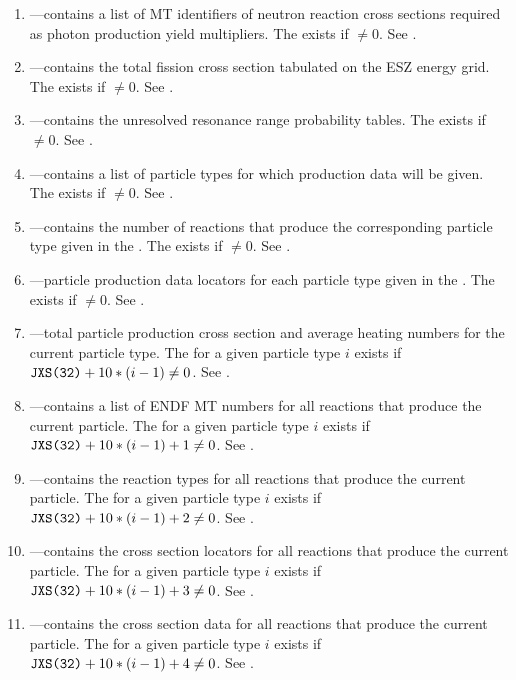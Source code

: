 \begin{enumerate}
  \item \textbf{}---contains a list of MT identifiers of neutron reaction cross sections required as photon production yield multipliers. The  exists if $\neq0$. See .
  \item \textbf{}---contains the total fission cross section tabulated on the ESZ energy grid. The  exists if $\neq0$. See .
  \item \textbf{}---contains the unresolved resonance range probability tables. The  exists if $\neq0$. See .
  \item \textbf{}---contains a list of particle types for which production data will be given. The  exists if $\neq0$. See .
  \item \textbf{}---contains the number of reactions that produce the corresponding particle type given in the . The  exists if $\neq0$. See .
  \item \textbf{}---particle production data locators for each particle type given in the . The  exists if $\neq 0$. See .
  \item \textbf{}---total particle production cross section and average heating numbers for the current particle type. The  for a given particle type $i$ exists if $\texttt{JXS(32)}+10*(i-1) \neq 0$. See .
  \item \textbf{}---contains a list of ENDF MT numbers for all reactions that produce the current particle. The  for a given particle type $i$ exists if $\texttt{JXS(32)}+10*(i-1) + 1 \neq 0$. See .
  \item \textbf{}---contains the reaction types for all reactions that produce the current particle. The  for a given particle type $i$ exists if $\texttt{JXS(32)}+10*(i-1) + 2 \neq 0$. See .
  \item \textbf{}---contains the cross section locators for all reactions that produce the current particle. The  for a given particle type $i$ exists if $\texttt{JXS(32)}+10*(i-1) + 3 \neq 0$. See .
  \item \textbf{}---contains the cross section data for all reactions that produce the current particle. The  for a given particle type $i$ exists if $\texttt{JXS(32)}+10*(i-1) + 4 \neq 0$. See .

\end{enumerate}
